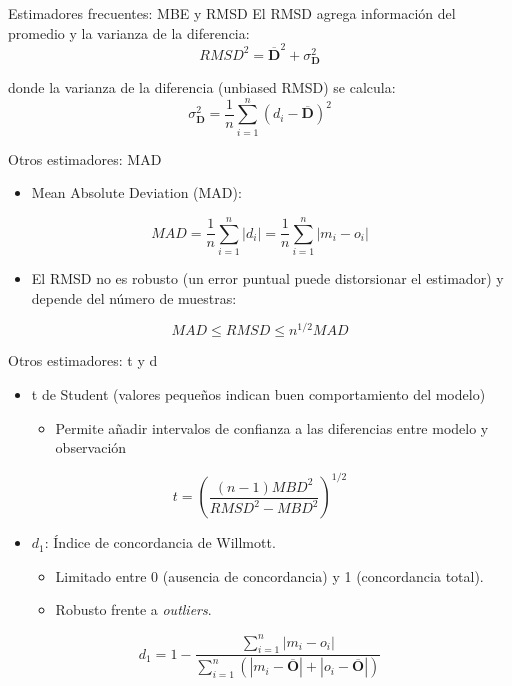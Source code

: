 \documentclass[aspectratio=169, usenames,svgnames,dvipsnames]{beamer}
\begin{document}
\begin{frame}[label={sec:orgf755235}]{Estimadores frecuentes: MBE y RMSD}
El RMSD agrega información del promedio y la varianza de la
  diferencia:
\[
RMSD^2= \overline{\mathbf{D}}^2 + \sigma^2_{\mathbf{D}} 
\]

donde la varianza de la diferencia (unbiased RMSD) se calcula:
\[
\sigma^2_{\mathbf{D}} = \frac{1}{n} \sum_{i=1}^n (d_i - \overline{\mathbf{D}})^2
\]
\end{frame}


\begin{frame}[label={sec:orgb510e56}]{Otros estimadores: MAD}
\begin{itemize}
\item Mean Absolute Deviation (MAD):
\end{itemize}

\[
MAD = \frac{1}{n} \sum_{i=1}^n \left|d_i\right| =  \frac{1}{n} \sum_{i=1}^n \left|m_i - o_i\right|
\]
\begin{itemize}
\item El RMSD no es robusto (un error puntual puede distorsionar el estimador) y depende del número de muestras:
\end{itemize}
\[
MAD \leq RMSD \leq n^{1/2} MAD
\]

\nocite{Willmott.Matsuura.ea2009, Willmott.Matsuura2005a}
\end{frame}

\begin{frame}[label={sec:org726d358}]{Otros estimadores: t y d}
\begin{itemize}
\item t de Student (valores pequeños indican buen comportamiento del modelo)
\begin{itemize}
\item Permite añadir intervalos de confianza a las diferencias entre
modelo y observación
\end{itemize}
\end{itemize}

\[
t = \left ( \frac{(n-1) MBD^2}{RMSD^2 - MBD^2} \right)^{1/2}
\]

\nocite{Stone1993}


\begin{itemize}
\item \(d_1\): Índice de concordancia de Willmott.
\begin{itemize}
\item Limitado entre 0 (ausencia de concordancia) y 1 (concordancia total).
\item Robusto frente a \emph{outliers}.
\end{itemize}
\end{itemize}
\[
d_1 = 1 - \frac{\sum_{i=1}^n \left| m_i - o_i \right|}{\sum_{i=1}^n \left(
  \left| m_i - \overline{\mathbf{O}}\right| + \left| o_i -
    \overline{\mathbf{O}} \right| \right)}
\]

\nocite{Willmott.Robeson.ea2012}
\end{frame}
\end{document}
